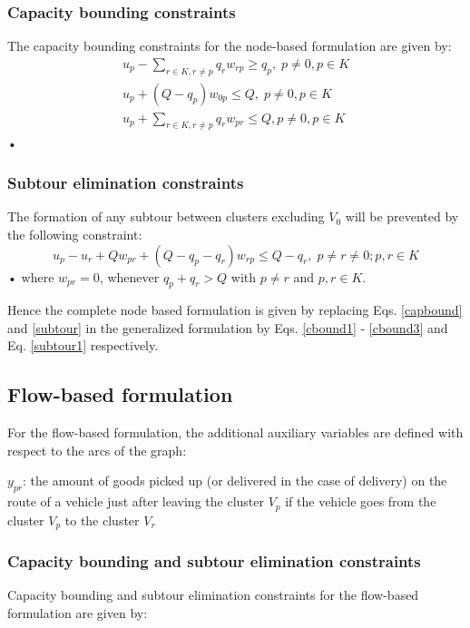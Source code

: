 \documentclass[letterpaper,12pt,onehalfspacing,twoside]{article}
\theoremstyle{msds}
\begin{document}
\subsubsection{Capacity bounding constraints}
The capacity bounding constraints for the node-based formulation are given by:
\begin{align}
u_p - \sum_{r \in K, r \ne p}q_r w_{rp} \ge q_p, \; p \ne 0, p \in K \label{cbound1}\\
u_p + (Q - q_p) w_{0p} \le Q, \; p \ne 0, p \in K \label{cbound2}\\
u_p + \sum_{r \in K, r \ne p} q_r w_{pr} \le Q, p \ne 0, p \in K \label{cbound3}
\end{align}•

\subsubsection{Subtour elimination constraints}
The formation of any subtour between clusters excluding $V_0$ will be prevented by the following constraint:
\begin{equation}
u_p - u_r + Q w_{pr} + (Q - q_p - q_r) w_{rp} \le Q - q_r, \;  p \ne r \ne 0; p, r \in K
\label{subtour1}
\end{equation}•
where $w_{pr} = 0$, whenever $q_p + q_r > Q$ with $p \ne r$ and $p, r \in K$. 

Hence the complete node based formulation is given by replacing Eqs. \eqref{capbound} and \eqref{subtour} in the generalized formulation by  Eqs. \eqref{cbound1} - \eqref{cbound3} and Eq. \eqref{subtour1} respectively.

\subsection{Flow-based formulation}
For the flow-based formulation, the additional auxiliary variables are defined with respect to the arcs of the graph:

$y_{pr}$: the amount of goods picked up (or delivered in the case of delivery) on the route of a vehicle just after leaving the cluster $V_p$ if the vehicle goes from the cluster $V_p$ to the cluster $V_r$

\subsubsection{Capacity bounding and subtour elimination constraints}
Capacity bounding and subtour elimination constraints for the flow-based formulation are given by:
\end{document}
